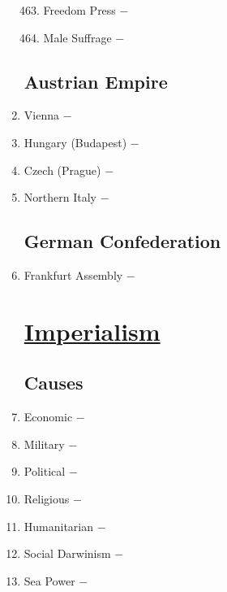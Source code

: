 \documentclass[12pt]{article}
\begin{document}
\begin{enumerate}
\begin{enumerate}[label=\arabic{*}.]
\setcounter{enumii}{462}

\item Freedom Press $-$ 

\item Male Suffrage $-$ 

\end{enumerate}
\setcounter{enumi}{464}

\subsection{Austrian Empire}

\item Vienna $-$ 

\item Hungary (Budapest) $-$ 

\item Czech (Prague) $-$ 

\item Northern Italy $-$ 

\subsection{German Confederation}


\item Frankfurt Assembly $-$ 

\section{\underline{Imperialism}}

\subsection{Causes}

\item Economic $-$ 

\item Military $-$ 

\item Political $-$ 

\item Religious $-$ 

\item Humanitarian $-$ 

\item Social Darwinism $-$ 

\item Sea Power $-$ 


\end{enumerate}
\end{document}
